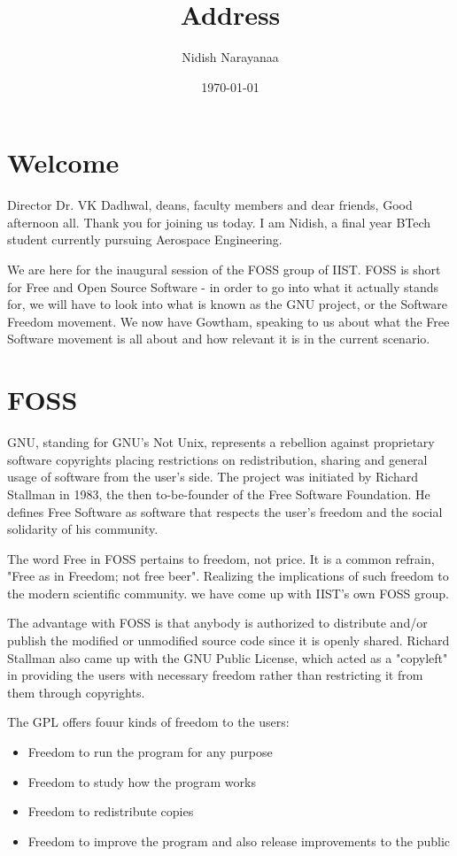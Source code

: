 \documentclass[11pt]{article}
\author{Nidish Narayanaa}
\date{\today}
\title{Address}
\begin{document}
\maketitle

\section{Welcome}
\label{sec-1}
Director Dr. VK Dadhwal, deans, faculty members and dear friends, Good
afternoon all. Thank you for joining us today. I am Nidish, a final
year BTech student currently pursuing Aerospace Engineering.

We are here for the inaugural session of the FOSS group of IIST. FOSS
is short for Free and Open Source Software - in order to go into what
it actually stands for, we will have to look into what is known as the
GNU project, or the Software Freedom movement. We now have Gowtham,
speaking to us about what the Free Software movement is all about and
how relevant it is in the current scenario.

\section{FOSS}
\label{sec-2}
GNU, standing for GNU's Not Unix, represents a rebellion against
proprietary software copyrights placing restrictions on
redistribution, sharing and general usage of software from the
user's side. The project was initiated by Richard Stallman in 1983,
the then to-be-founder of the Free Software Foundation. He defines
Free Software as software that respects the user's freedom and the
social solidarity of his community.

The word Free in FOSS pertains to freedom, not price. It is a common
refrain, "Free as in Freedom; not free beer". Realizing the
implications of such freedom to the modern scientific community. we
have come up with IIST's own FOSS group.

The advantage with FOSS is that anybody is authorized to distribute
and/or publish the modified or unmodified source code since it is
openly shared. Richard Stallman also came up with the GNU Public
License, which acted as a "copyleft" in providing the users with
necessary freedom rather than restricting it from them through
copyrights. 

The GPL offers fouur kinds of freedom to the users:
\begin{itemize}
\item Freedom to run the program for any purpose
\item Freedom to study how the program works
\item Freedom to redistribute copies
\item Freedom to improve the program and also release improvements to
the public
\end{itemize}
\end{document}
